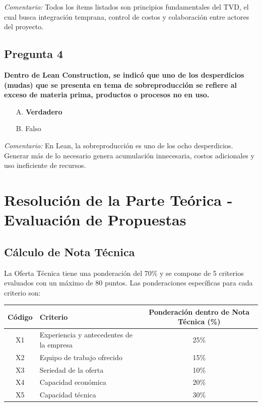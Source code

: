 \textit{Comentario:} Todos los ítems listados son principios fundamentales del TVD, el cual busca integración temprana, control de costos y colaboración entre actores del proyecto.

\subsection*{Pregunta 4}
\textbf{Dentro de Lean Construction, se indicó que uno de los desperdicios (mudas) que se presenta en tema de sobreproducción se refiere al exceso de materia prima, productos o procesos no en uso.}
\begin{itemize}
    \item[A.] \textbf{Verdadero}
    \item[B.] Falso
\end{itemize}

\textit{Comentario:} En Lean, la sobreproducción es uno de los ocho desperdicios. Generar más de lo necesario genera acumulación innecesaria, costos adicionales y uso ineficiente de recursos.

\section{Resolución de la Parte Teórica - Evaluación de Propuestas}

\subsection*{Cálculo de Nota Técnica}

La Oferta Técnica tiene una ponderación del 70\% y se compone de 5 criterios evaluados con un máximo de 80 puntos. Las ponderaciones específicas para cada criterio son:

\begin{center}
\begin{tabular}{|c|l|c|}
\hline
\textbf{Código} & \textbf{Criterio} & \textbf{Ponderación dentro de Nota Técnica (\%)} \\
\hline
X1 & Experiencia y antecedentes de la empresa & 25\% \\
X2 & Equipo de trabajo ofrecido               & 15\% \\
X3 & Seriedad de la oferta                    & 10\% \\
X4 & Capacidad económica                      & 20\% \\
X5 & Capacidad técnica                        & 30\% \\
\hline
\end{tabular}
\end{center}

